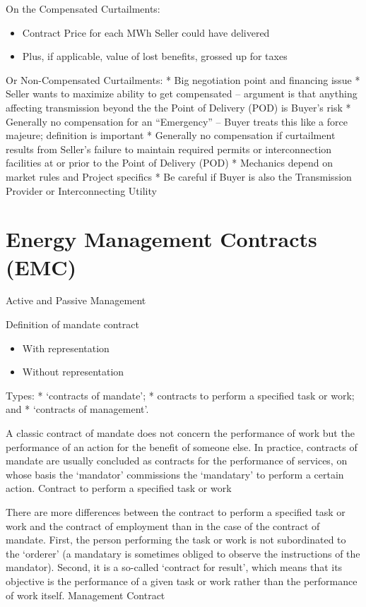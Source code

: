 \documentclass[]{book}
\providecommand{\tightlist}{%
  \setlength{\itemsep}{0pt}\setlength{\parskip}{0pt}}
\theoremstyle{definition}
\theoremstyle{definition}
\theoremstyle{definition}
\theoremstyle{remark}
\begin{document}
On the Compensated Curtailments:

\begin{itemize}
\tightlist
\item
  Contract Price for each MWh Seller could have delivered
\item
  Plus, if applicable, value of lost benefits, grossed up for taxes
\end{itemize}

Or Non-Compensated Curtailments: * Big negotiation point and financing
issue * Seller wants to maximize ability to get compensated -- argument
is that anything affecting transmission beyond the the Point of Delivery
(POD) is Buyer's risk * Generally no compensation for an ``Emergency''
-- Buyer treats this like a force majeure; definition is important *
Generally no compensation if curtailment results from Seller's failure
to maintain required permits or interconnection facilities at or prior
to the Point of Delivery (POD) * Mechanics depend on market rules and
Project specifics * Be careful if Buyer is also the Transmission
Provider or Interconnecting Utility

\section{Energy Management Contracts
(EMC)}\label{energy-management-contracts-emc}

Active and Passive Management

Definition of mandate contract

\begin{itemize}
\tightlist
\item
  With representation
\item
  Without representation
\end{itemize}

Types: * `contracts of mandate'; * contracts to perform a specified task
or work; and * `contracts of management'.

A classic contract of mandate does not concern the performance of work
but the performance of an action for the benefit of someone else. In
practice, contracts of mandate are usually concluded as contracts for
the performance of services, on whose basis the `mandator' commissions
the `mandatary' to perform a certain action. Contract to perform a
specified task or work

There are more differences between the contract to perform a specified
task or work and the contract of employment than in the case of the
contract of mandate. First, the person performing the task or work is
not subordinated to the `orderer' (a mandatary is sometimes obliged to
observe the instructions of the mandator). Second, it is a so-called
`contract for result', which means that its objective is the performance
of a given task or work rather than the performance of work itself.
Management Contract
\end{document}
